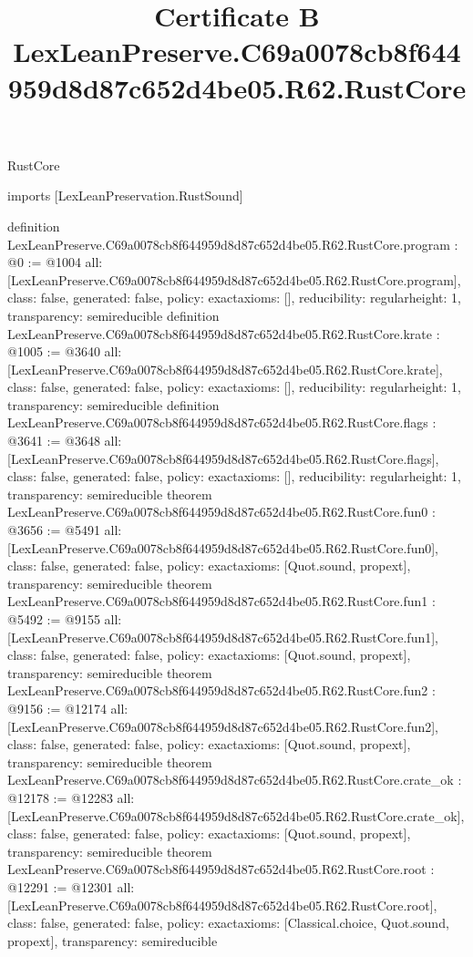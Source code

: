 \begin{lexlean}{RustCore}
\title{Certificate B LexLeanPreserve.C69a0078cb8f644959d8d87c652d4be05.R62.RustCore}
\begin{coremodule}
imports [LexLeanPreservation.RustSound]

definition LexLeanPreserve.C69a0078cb8f644959d8d87c652d4be05.R62.RustCore.program : @0 := @1004 {
  all: [LexLeanPreserve.C69a0078cb8f644959d8d87c652d4be05.R62.RustCore.program],
  class: false,
  generated: false,
  policy: exact{axioms: []},
  reducibility: regular{height: 1},
  transparency: semireducible
}
definition LexLeanPreserve.C69a0078cb8f644959d8d87c652d4be05.R62.RustCore.krate : @1005 := @3640 {
  all: [LexLeanPreserve.C69a0078cb8f644959d8d87c652d4be05.R62.RustCore.krate],
  class: false,
  generated: false,
  policy: exact{axioms: []},
  reducibility: regular{height: 1},
  transparency: semireducible
}
definition LexLeanPreserve.C69a0078cb8f644959d8d87c652d4be05.R62.RustCore.flags : @3641 := @3648 {
  all: [LexLeanPreserve.C69a0078cb8f644959d8d87c652d4be05.R62.RustCore.flags],
  class: false,
  generated: false,
  policy: exact{axioms: []},
  reducibility: regular{height: 1},
  transparency: semireducible
}
theorem LexLeanPreserve.C69a0078cb8f644959d8d87c652d4be05.R62.RustCore.fun0 : @3656 := @5491 {
  all: [LexLeanPreserve.C69a0078cb8f644959d8d87c652d4be05.R62.RustCore.fun0],
  class: false,
  generated: false,
  policy: exact{axioms: [Quot.sound, propext]},
  transparency: semireducible
}
theorem LexLeanPreserve.C69a0078cb8f644959d8d87c652d4be05.R62.RustCore.fun1 : @5492 := @9155 {
  all: [LexLeanPreserve.C69a0078cb8f644959d8d87c652d4be05.R62.RustCore.fun1],
  class: false,
  generated: false,
  policy: exact{axioms: [Quot.sound, propext]},
  transparency: semireducible
}
theorem LexLeanPreserve.C69a0078cb8f644959d8d87c652d4be05.R62.RustCore.fun2 : @9156 := @12174 {
  all: [LexLeanPreserve.C69a0078cb8f644959d8d87c652d4be05.R62.RustCore.fun2],
  class: false,
  generated: false,
  policy: exact{axioms: [Quot.sound, propext]},
  transparency: semireducible
}
theorem LexLeanPreserve.C69a0078cb8f644959d8d87c652d4be05.R62.RustCore.crate_ok : @12178 := @12283 {
  all: [LexLeanPreserve.C69a0078cb8f644959d8d87c652d4be05.R62.RustCore.crate_ok],
  class: false,
  generated: false,
  policy: exact{axioms: [Quot.sound, propext]},
  transparency: semireducible
}
theorem LexLeanPreserve.C69a0078cb8f644959d8d87c652d4be05.R62.RustCore.root : @12291 := @12301 {
  all: [LexLeanPreserve.C69a0078cb8f644959d8d87c652d4be05.R62.RustCore.root],
  class: false,
  generated: false,
  policy: exact{axioms: [Classical.choice, Quot.sound, propext]},
  transparency: semireducible
}


\end{coremodule}
\end{lexlean}
